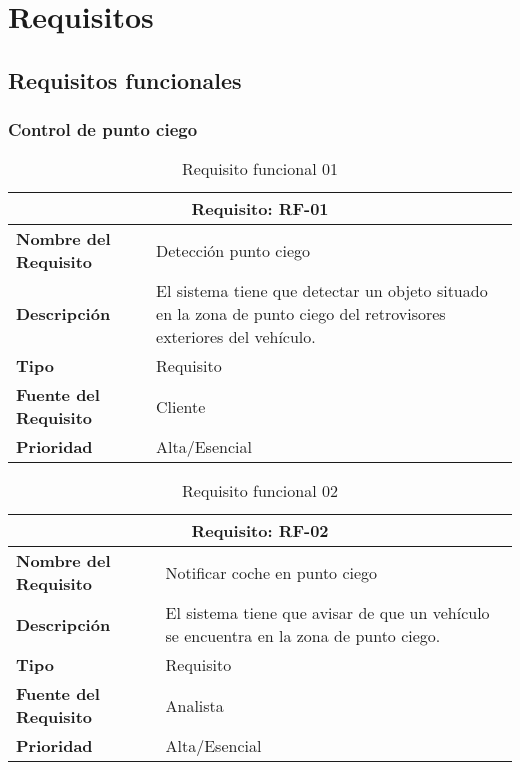 

\section{Requisitos}
\subsection{Requisitos funcionales}


\subsubsection{Control de punto ciego}

\begin{table}[H]
\begin{center}
\begin{tabular}{p{} p{7cm}}
\multicolumn{2}{c}{\textbf{Requisito: RF-01} } \\
\hline \hline
\textbf{Nombre del Requisito} & Detección punto ciego  \\
\hline
\textbf{Descripción} & El sistema tiene que detectar un objeto situado en la zona de punto ciego del retrovisores exteriores del vehículo.  \\
\hline
\textbf{Tipo} & Requisito  \\
\hline
\textbf{Fuente del Requisito} & Cliente  \\
\hline
\textbf{Prioridad} & Alta/Esencial  \\ \hline
\end{tabular}
\caption{Requisito funcional 01}
\label{tab:personal}
\end{center}
\end{table}

\begin{table}[H]
\begin{center}
\begin{tabular}{p{} p{7cm}}
\multicolumn{2}{c}{\textbf{Requisito: RF-02} } \\
\hline \hline
\textbf{Nombre del Requisito} & Notificar coche en punto ciego  \\
\hline
\textbf{Descripción} & El sistema tiene que avisar de que un vehículo se encuentra en la zona de punto ciego. \\
\hline
\textbf{Tipo} & Requisito  \\
\hline
\textbf{Fuente del Requisito} & Analista  \\
\hline
\textbf{Prioridad} & Alta/Esencial  \\ \hline
\end{tabular}
\caption{Requisito funcional 02}
\label{tab:personal}
\end{center}
\end{table}


